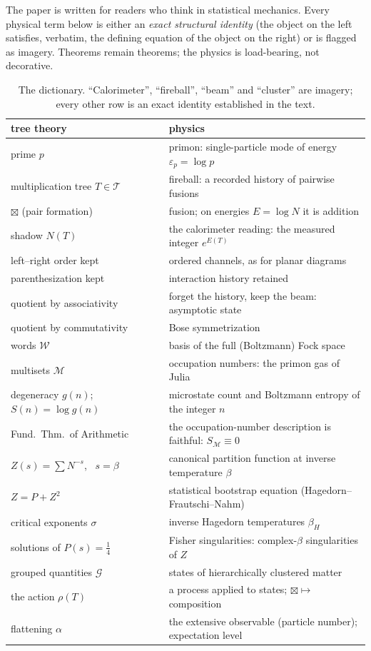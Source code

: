 \documentclass[11pt]{article}
\newcommand{\cT}{\mathcal{T}}   %
\newcommand{\cW}{\mathcal{W}}   %
\newcommand{\cM}{\mathcal{M}}   %
\newcommand{\cG}{\mathcal{G}}   %
\newcommand{\act}{\rho}
\numberwithin{equation}{section}
\theoremstyle{plain}
\theoremstyle{definition}
\theoremstyle{remark}
\begin{document}
The paper is written for readers who think in statistical mechanics. Every physical
term below is either an \emph{exact structural identity} (the object on the left
satisfies, verbatim, the defining equation of the object on the right) or is flagged
as imagery. Theorems remain theorems; the physics is load-bearing, not decorative.

\begin{table}[ht]
\centering\small
\begin{tabular}{@{}ll@{}}
\toprule
tree theory & physics \\
\midrule
prime $p$ & primon: single-particle mode of energy $\varepsilon_p = \log p$ \\
multiplication tree $T \in \cT$ & fireball: a recorded history of pairwise fusions \\
$\boxtimes$ (pair formation) & fusion; on energies $E = \log N$ it is addition \\
shadow $N(T)$ & the calorimeter reading: the measured integer $e^{E(T)}$ \\
left--right order kept & ordered channels, as for planar diagrams \\
parenthesization kept & interaction history retained \\
quotient by associativity & forget the history, keep the beam: asymptotic state \\
quotient by commutativity & Bose symmetrization \\
words $\cW$ & basis of the full (Boltzmann) Fock space \\
multisets $\cM$ & occupation numbers: the primon gas of Julia \\
degeneracy $g(n)$; \ $S(n) = \log g(n)$ & microstate count and Boltzmann entropy of the integer $n$ \\
Fund.\ Thm.\ of Arithmetic & the occupation-number description is faithful: $S_\cM \equiv 0$ \\
$Z(s) = \sum N^{-s}$, \ $s = \beta$ & canonical partition function at inverse temperature $\beta$ \\
$Z = P + Z^2$ & statistical bootstrap equation (Hagedorn--Frautschi--Nahm) \\
critical exponents $\sigma$ & inverse Hagedorn temperatures $\beta_H$ \\
solutions of $P(s) = \tfrac14$ & Fisher singularities: complex-$\beta$ singularities of $Z$ \\
grouped quantities $\cG$ & states of hierarchically clustered matter \\
the action $\act(T)$ & a process applied to states; $\boxtimes \mapsto$ composition \\
flattening $\alpha$ & the extensive observable (particle number); expectation level \\
\bottomrule
\end{tabular}
\caption{The dictionary. ``Calorimeter'', ``fireball'', ``beam'' and ``cluster'' are
imagery; every other row is an exact identity established in the text.}
\label{tab:dictionary}
\end{table}
\end{document}

